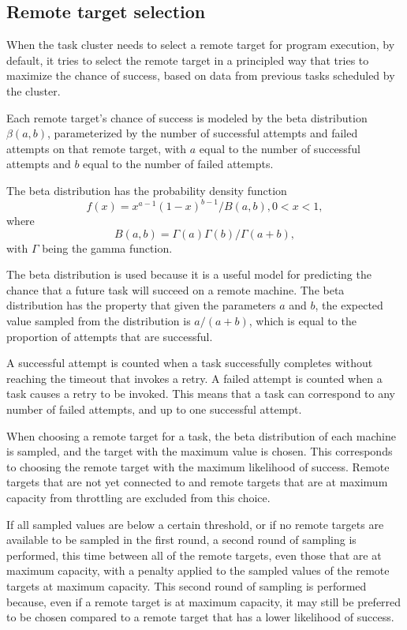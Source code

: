 \documentclass[oneside]{report}
\begin{document}
\subsection{Remote target selection}
When the task cluster needs to select a remote target for program execution, by default, it tries to select the remote target in a principled way that tries to maximize the chance of success, based on data from previous tasks scheduled by the cluster.

Each remote target's chance of success is modeled by the beta distribution $\beta(a, b)$, parameterized by the number of successful attempts and failed attempts on that remote target, with $a$ equal to the number of successful attempts and $b$ equal to the number of failed attempts.

The beta distribution has the probability density function
$$ f(x) = x^{a-1}(1-x)^{b-1} / B(a, b), 0 < x < 1,$$
where
$$ B(a, b) = \Gamma(a)\Gamma(b) / \Gamma(a+b), $$
with $\Gamma$ being the gamma function.

The beta distribution is used because it is a useful model for predicting the chance that a future task will succeed on a remote machine.
The beta distribution has the property that given the parameters $a$ and $b$, the expected value sampled from the distribution is $a/(a+b)$, which is equal to the proportion of attempts that are successful.

A successful attempt is counted when a task successfully completes without reaching the timeout that invokes a retry.
A failed attempt is counted when a task causes a retry to be invoked.
This means that a task can correspond to any number of failed attempts, and up to one successful attempt.

When choosing a remote target for a task, the beta distribution of each machine is sampled, and the target with the maximum value is chosen.
This corresponds to choosing the remote target with the maximum likelihood of success.
Remote targets that are not yet connected to and remote targets that are at maximum capacity from throttling are excluded from this choice.

If all sampled values are below a certain threshold, or if no remote targets are available to be sampled in the first round, a second round of sampling is performed, this time between all of the remote targets, even those that are at maximum capacity, with a penalty applied to the sampled values of the remote targets at maximum capacity.
This second round of sampling is performed because, even if a remote target is at maximum capacity, it may still be preferred to be chosen compared to a remote target that has a lower likelihood of success.
\end{document}
